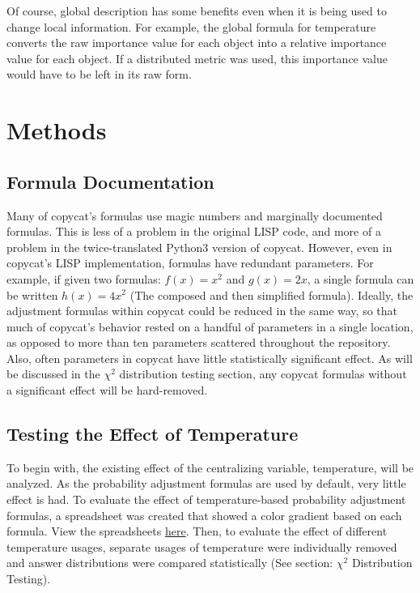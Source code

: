 \documentclass[a4paper]{article}
\begin{document}
    Of course, global description has some benefits even when it is being used to change local information.
    For example, the global formula for temperature converts the raw importance value for each object into a relative importance value for each object.
    If a distributed metric was used, this importance value would have to be left in its raw form.

\section{Methods}

    \subsection{Formula Documentation}

        Many of copycat's formulas use magic numbers and marginally documented formulas.
        This is less of a problem in the original LISP code, and more of a problem in the twice-translated Python3 version of copycat.
        However, even in copycat's LISP implementation, formulas have redundant parameters.
        For example, if given two formulas: $f(x) = x^2$ and $g(x) = 2x$, a single formula can be written $h(x) = 4x^2$ (The composed and then simplified formula).
        Ideally, the adjustment formulas within copycat could be reduced in the same way, so that much of copycat's behavior rested on a handful of parameters in a single location, as opposed to more than ten parameters scattered throughout the repository.
        Also, often parameters in copycat have little statistically significant effect.
        As will be discussed in the $\chi^2$ distribution testing section, any copycat formulas without a significant effect will be hard-removed.

    \subsection{Testing the Effect of Temperature}

        To begin with, the existing effect of the centralizing variable, temperature, will be analyzed.
        As the probability adjustment formulas are used by default, very little effect is had.
        To evaluate the effect of temperature-based probability adjustment formulas, a spreadsheet was created that showed a color gradient based on each formula.
        View the spreadsheets \href{https://docs.google.com/spreadsheets/d/1JT2yCBUAsFzMcbKsQUcH1DhcBbuWDKTgPvUwD9EqyTY/edit?usp=sharing}{here}.
        Then, to evaluate the effect of different temperature usages, separate usages of temperature were individually removed and answer distributions were compared statistically (See section: $\chi^2$ Distribution Testing).
\end{document}
